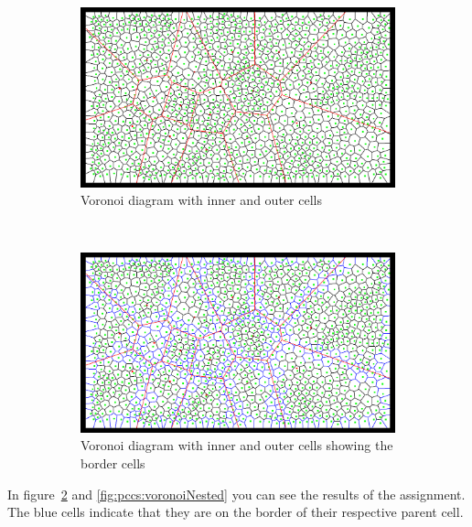 \documentclass[11pt,a4paper,twocolumn]{article}
\begin{document}
\begin{figure}[ht]
	\centering
	\begin{subfigure}[b]{0.5\textwidth}
	\centering
	\includegraphics[width=\textwidth]{images/voronoiwchild.png}
	\caption{Voronoi diagram with inner and outer cells} \label{fig:pccs:voronoiwchild}
	\end{subfigure}
	~
	\begin{subfigure}[b]{0.5\textwidth}
	\centering
	\includegraphics[width=\textwidth]{images/voronoiwchildborder.png}
	\caption{Voronoi diagram with inner and outer cells showing the border cells} \label{fig:pccs:voronoiwchildborders}
	\end{subfigure}
	\caption{ }\label{fig:children}
\end{figure}
In figure~\ref{fig:pccs:voronoiwchildborders} and \ref{fig:pccs:voronoiNested} you can see the results of the assignment. The blue cells indicate that they are on the border of their respective parent cell. 
\end{document}
